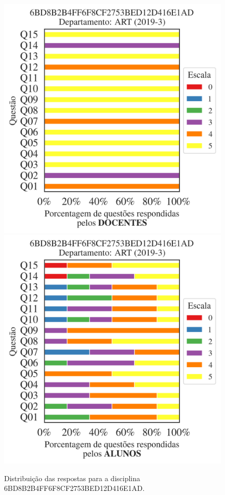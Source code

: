 \documentclass[a4paper,10pt]{article}
\begin{document}
\begin{figure}[h]
\centering
\includegraphics[width=0.485\linewidth]{analise_disciplina_departamento_ART_6BD8B2B4FF6F8CF2753BED12D416E1AD_docentes.png}
\includegraphics[width=0.485\linewidth]{analise_disciplina_departamento_ART_6BD8B2B4FF6F8CF2753BED12D416E1AD_alunos.png}
\caption{\label{fig:analise_geral_departamento}                Distribuição das respostas para a disciplina 6BD8B2B4FF6F8CF2753BED12D416E1AD. }
\end{figure}
\end{document}
